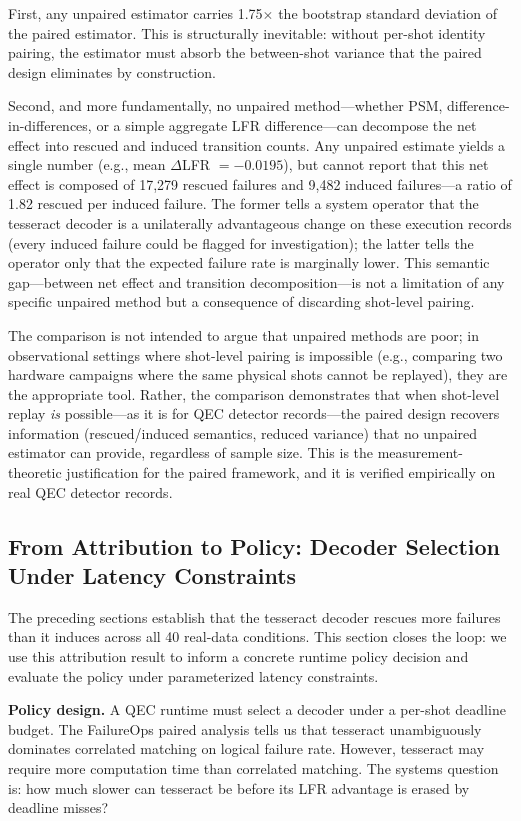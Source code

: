 First, any unpaired estimator carries 1.75$\times$ the bootstrap standard deviation of the paired estimator. This is structurally inevitable: without per-shot identity pairing, the estimator must absorb the between-shot variance that the paired design eliminates by construction.

Second, and more fundamentally, no unpaired method---whether PSM, difference-in-differences, or a simple aggregate LFR difference---can decompose the net effect into rescued and induced transition counts. Any unpaired estimate yields a single number (e.g., mean $\Delta$LFR $= -0.0195$), but cannot report that this net effect is composed of 17,279 rescued failures and 9,482 induced failures---a ratio of 1.82 rescued per induced failure. The former tells a system operator that the tesseract decoder is a unilaterally advantageous change on these execution records (every induced failure could be flagged for investigation); the latter tells the operator only that the expected failure rate is marginally lower. This semantic gap---between net effect and transition decomposition---is not a limitation of any specific unpaired method but a consequence of discarding shot-level pairing.

The comparison is not intended to argue that unpaired methods are poor; in observational settings where shot-level pairing is impossible (e.g., comparing two hardware campaigns where the same physical shots cannot be replayed), they are the appropriate tool. Rather, the comparison demonstrates that when shot-level replay \emph{is} possible---as it is for QEC detector records---the paired design recovers information (rescued/induced semantics, reduced variance) that no unpaired estimator can provide, regardless of sample size. This is the measurement-theoretic justification for the paired framework, and it is verified empirically on real QEC detector records.

\subsection{From Attribution to Policy: Decoder Selection Under Latency Constraints}

The preceding sections establish that the tesseract decoder rescues more failures than it induces across all 40 real-data conditions. This section closes the loop: we use this attribution result to inform a concrete runtime policy decision and evaluate the policy under parameterized latency constraints.

\textbf{Policy design.} A QEC runtime must select a decoder under a per-shot deadline budget. The FailureOps paired analysis tells us that tesseract unambiguously dominates correlated matching on logical failure rate. However, tesseract may require more computation time than correlated matching. The systems question is: how much slower can tesseract be before its LFR advantage is erased by deadline misses?

